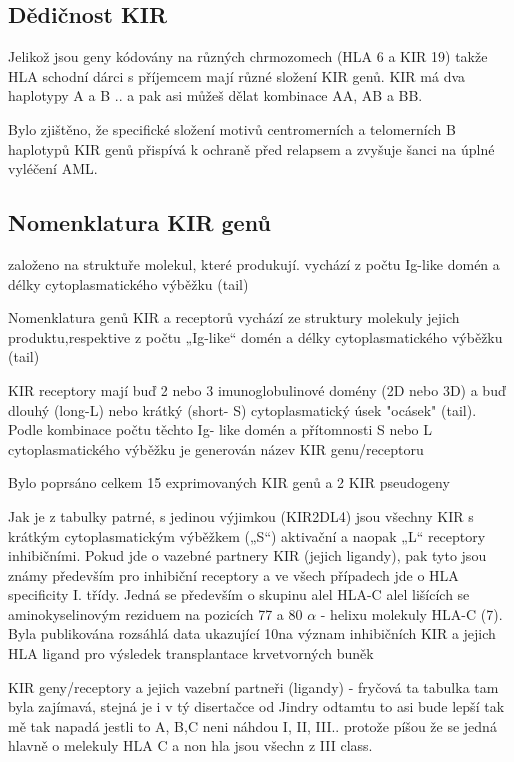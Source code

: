 \documentclass[czech,DP]{thesiskiv}
\begin{document}
\subsection{Dědičnost KIR}
Jelikož jsou geny kódovány na různých chrmozomech (HLA 6 a KIR 19) takže HLA schodní dárci s příjemcem mají různé složení KIR genů.
KIR má dva haplotypy A a B .. a pak asi můžeš dělat kombinace AA, AB a BB.






Bylo zjištěno, že
specifické složení motivů centromerních a telomerních B haplotypů KIR genů přispívá
k ochraně před relapsem a zvyšuje šanci na úplné vyléčení AML.


\subsection{Nomenklatura KIR genů}
založeno na struktuře molekul, které produkují. 
vychází z počtu Ig-like domén a délky cytoplasmatického výběžku (tail)

Nomenklatura genů KIR a receptorů vychází ze struktury molekuly
jejich produktu,respektive z počtu „Ig-like“ domén a délky
cytoplasmatického výběžku (tail)

KIR receptory mají buď 2 nebo 3 imunoglobulinové domény (2D nebo 3D) a buď dlouhý
(long-L) nebo krátký (short- S) cytoplasmatický úsek "ocásek" (tail). Podle kombinace počtu těchto Ig-
like domén a přítomnosti S nebo L cytoplasmatického výběžku je generován název KIR
genu/receptoru

Bylo poprsáno celkem 15 exprimovaných KIR genů a 2 KIR pseudogeny

Jak je z tabulky patrné, s jedinou výjimkou (KIR2DL4) jsou všechny
KIR s krátkým cytoplasmatickým výběžkem („S“) aktivační a naopak
„L“ receptory inhibičními.
Pokud jde o vazebné partnery KIR (jejich ligandy), pak tyto jsou
známy především pro inhibiční receptory a ve všech případech jde o
HLA specificity I. třídy. Jedná se především o skupinu alel HLA-C alel
lišících se aminokyselinovým 
reziduem na pozicích
 77 a 80 $\alpha$
- helixu molekuly HLA-C (7). Byla publikována rozsáhlá data ukazující
10na význam inhibičních KIR a jejich HLA ligand pro výsledek
transplantace krvetvorných buněk

KIR geny/receptory a jejich vazební partneři (ligandy)
- fryčová ta tabulka tam byla zajímavá, stejná je i v tý disertačce od Jindry odtamtu to asi bude lepší
tak mě tak napadá jestli to A, B,C neni náhdou I, II, III.. protože píšou že se jedná hlavně o melekuly HLA C a non hla jsou všechn z III class.
\end{document}
